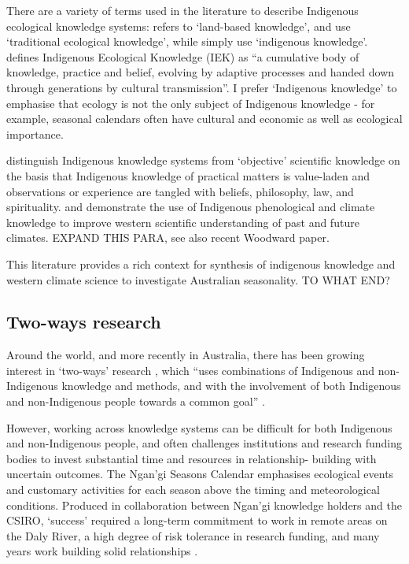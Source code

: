 There are a variety of terms used in the literature to describe Indigenous
ecological knowledge systems:  \citet{clarke2009} refers to `land-based knowledge',
\citet{petheram2010} and \citet{turner2009} use `traditional ecological
knowledge', while \citet{cochran2015} simply use `indigenous knowledge'.
\citet{berkes2012} defines Indigenous Ecological Knowledge (IEK) as ``a cumulative
body of knowledge, practice and belief, evolving by adaptive processes and
handed down through generations by cultural transmission''.  I prefer
`Indigenous knowledge' to emphasise that ecology is not the only subject of
Indigenous knowledge - for example, seasonal calendars often have cultural and
economic as well as ecological importance.


\citet{turner2009} distinguish Indigenous knowledge systems from `objective'
scientific knowledge on the basis that Indigenous knowledge of practical
matters is value-laden and observations or experience are tangled with beliefs,
philosophy, law, and spirituality.  \citet{green2010a} and \citet{clarke2009}
demonstrate the use of Indigenous phenological and climate knowledge to improve
western scientific understanding of past and future climates.
EXPAND THIS PARA, see also recent Woodward paper.

This literature provides a rich context for synthesis of indigenous knowledge
and western climate science to investigate Australian seasonality.
TO WHAT END?



\subsection{Two-ways research}

Around the world, and more recently in Australia, there has been growing
interest in `two-ways' research \citep{turner2009,prober2011},
which ``uses combinations of Indigenous and non-Indigenous knowledge and
methods, and with the involvement of both Indigenous and non-Indigenous people
towards a common goal'' \citep{ens2014}.

However, working across knowledge systems can be difficult for both Indigenous
and non-Indigenous people, and often challenges institutions and research
funding bodies to invest substantial time and resources in relationship-
building with uncertain outcomes.  The Ngan'gi Seasons Calendar emphasises
ecological events and customary activities for each season above the timing and
meteorological conditions.  Produced in collaboration between Ngan'gi knowledge
holders and the CSIRO, `success' required a long-term commitment to work in
remote areas on the Daly River, a high degree of risk tolerance in
research funding, and many years work building solid relationships \citep{woodward2010}.

